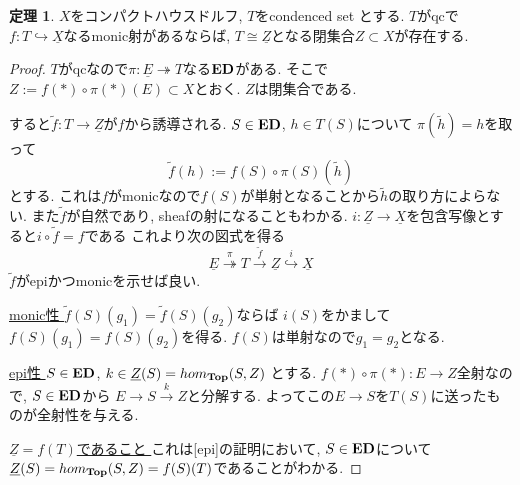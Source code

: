 \documentclass[dvipdfmx,a4paper,11pt]{article}
\theoremstyle{definition}
\newtheorem{thm}{定理}
\begin{document}
  \begin{tcolorbox}
 [colback = white, colframe = green!35!black, fonttitle = \bfseries,breakable = true]
 \begin{thm}\cite[Proposition 4.12.3]{Bar22}
 \label{thm-qs-monic}
$X$をコンパクトハウスドルフ, $T$をcondenced set とする.
$T$がqcで$f : T \hookrightarrow \underline{X}$なるmonic射があるならば, 
$T  \cong \underline{Z}$となる閉集合$Z \subset X$が存在する. 
 \end{thm}
 \end{tcolorbox}
 \begin{proof}
 $T$がqcなので$\pi : \underline{E} \twoheadrightarrow T$なる${\bf  ED}$がある. 
 そこで$Z:= f(\ast)\circ{\pi(\ast)}(E)  \subset X$とおく. 
 $Z$は閉集合である.
 
すると$\widetilde{f} : T \to \underline{Z}$が$f$から誘導される.
$S \in {\bf ED}$, $h \in T(S)$について
$\pi(\widetilde{h}) = h$を取って
$$
\widetilde{f}(h):= f(S) \circ \pi(S)(\widetilde{h})
$$
とする.
これは$f$がmonicなので$f(S)$が単射となることから$\widetilde{h}$の取り方によらない.
また$\widetilde{f}$が自然であり, sheafの射になることもわかる. 
$i : \underline{Z} \to \underline{X}$を包含写像とすると$i \circ \widetilde{f} = f$である
 これより次の図式を得る
 $$
 \underline{E} \overset{\pi}{\twoheadrightarrow}
 T \overset{\widetilde{f}}{\to}
  \underline{Z} \overset{i}{\hookrightarrow}
  \underline{X}
 $$
 $\widetilde{f}$がepiかつmonicを示せば良い.
 
 \underline{monic性 }$\widetilde{f}(S)(g_1) = \widetilde{f}(S)(g_2)$ならば
$i(S)$をかまして$f(S)(g_1) = f(S)(g_2)$を得る. $f(S)$は単射なので$g_1 = g_2$となる.

 \underline{epi性 } $S \in {\bf ED}$, $k \in \underline{Z}(S) = hom_{{\bf Top}}(S, Z)$
とする. $f(\ast)\circ{\pi(\ast)} : E \to Z$全射なので, $S \in {\bf ED}$から
$E \to S \overset{k}{\to} Z$と分解する. 
よってこの$E\to S$を$T(S)$に送ったものが全射性を与える.

 \underline{ $\underline{Z}=f(T)$であること }
これは[epi]の証明において, $S \in {\bf ED}$について$\underline{Z}(S) = hom_{{\bf Top}}(S, Z) = f(S)(T)$であることがわかる. 
 \end{proof}

 
\end{document}
